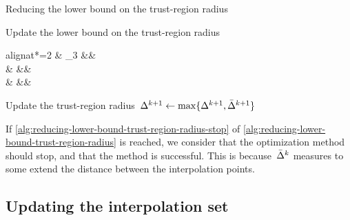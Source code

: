 \begin{algorithm}
    \caption{Reducing the lower bound on the trust-region radius}
    \label{alg:reducing-lower-bound-trust-region-radius}
    \DontPrintSemicolon
    \onehalfspacing
    Update the lower bound on the trust-region radius
    \begin{algoempheq}[left={\radlb[k + 1] \gets \empheqlbrace}]{alignat*=2}
        & \theta_3 \radlb[k]                && \quad {}\\
        & \sqrt{\radlb[k] \radlb[\infty]}   && \quad {}\\
        & \radlb[\infty]                    && \quad {}
    \end{algoempheq}
    Update the trust-region radius~$\rad[k + 1] \gets \max \set{\rad[k + 1], \radlb[k + 1]}$\;
\end{algorithm}

If \cref{alg:reducing-lower-bound-trust-region-radius-stop} of \cref{alg:reducing-lower-bound-trust-region-radius} is reached, we consider that the optimization method should stop, and that the method is successful.
This is because~$\radlb[k]$ measures to some extend the distance between the interpolation points.

\subsection{Updating the interpolation set}

